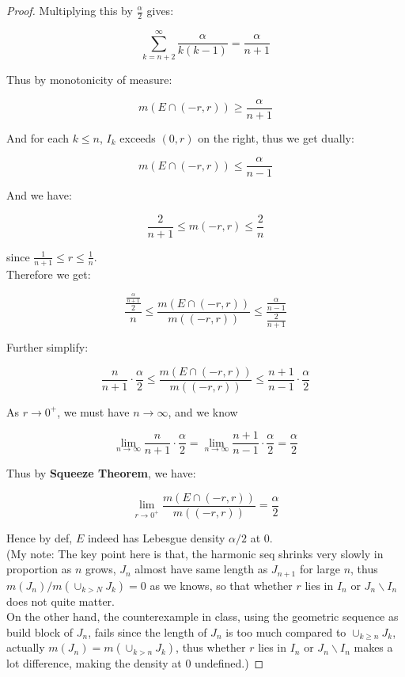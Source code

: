 \begin{proof}
Multiplying this by \(\frac{\alpha}{2}\) gives:

\[\sum\limits_{k = n + 2}^{\infty}\frac{\alpha}{k(k - 1)} = \frac{\alpha}{n + 1}\]

Thus by monotonicity of measure:

\[m(E \cap ( - r,r)) \geq \frac{\alpha}{n + 1}\]

And for each \(k \leq n\), \(I_{k}\) exceeds \((0,r)\) on the right, thus we get dually:

\[m(E \cap ( - r,r)) \leq \frac{\alpha}{n - 1}\]

And we have:

\[\frac{2}{n + 1} \leq m( - r,r) \leq \frac{2}{n}\]

since \(\frac{1}{n + 1} \leq r \leq \frac{1}{n}\).\\
Therefore we get:

\[\frac{\frac{\frac{\alpha}{n + 1}}{2}}{n} \leq \frac{m(E \cap ( - r,r))}{m(( - r,r))} \leq \frac{\frac{\alpha}{n - 1}}{\frac{2}{n + 1}}\]

Further simplify:

\[\frac{n}{n + 1} \cdot \frac{\alpha}{2} \leq \frac{m(E \cap ( - r,r))}{m(( - r,r))} \leq \frac{n + 1}{n - 1} \cdot \frac{\alpha}{2}\]

As \(r\rightarrow 0^{+}\), we must have \(n\rightarrow\infty\), and we know

\[\lim\limits_{n\rightarrow\infty}\frac{n}{n + 1} \cdot \frac{\alpha}{2} = \lim\limits_{n\rightarrow\infty}\frac{n + 1}{n - 1} \cdot \frac{\alpha}{2} = \frac{\alpha}{2}\]

Thus by \textbf{Squeeze Theorem}, we have:

\[\lim\limits_{r\rightarrow 0^{+}}\frac{m(E \cap ( - r,r))}{m(( - r,r))} = \frac{\alpha}{2}\]

Hence by def, \(E\) indeed has Lebesgue density \(\alpha/2\) at \(0\).\\
(My note: The key point here is that, the harmonic seq shrinks very slowly in proportion as \(n\) grows, \(J_{n}\) almost have same length as \(J_{n + 1}\) for large \(n\), thus \(m(J_{n})/m( \cup_{k > N}J_{k}) = 0\) as we knows, so that whether \(r\) lies in \(I_{n}\) or \(J_{n}\backslash I_{n}\) does not quite matter.\\
On the other hand, the counterexample in class, using the geometric sequence as build block of \(J_{n}\), fails since the length of \(J_{n}\) is too much compared to \(\cup_{k \geq n}J_{k}\), actually \(m(J_{n}) = m( \cup_{k > n}J_{k})\), thus whether \(r\) lies in \(I_{n}\) or \(J_{n}\backslash I_{n}\) makes a lot difference, making the density at \(0\) undefined.)

\end{proof}

